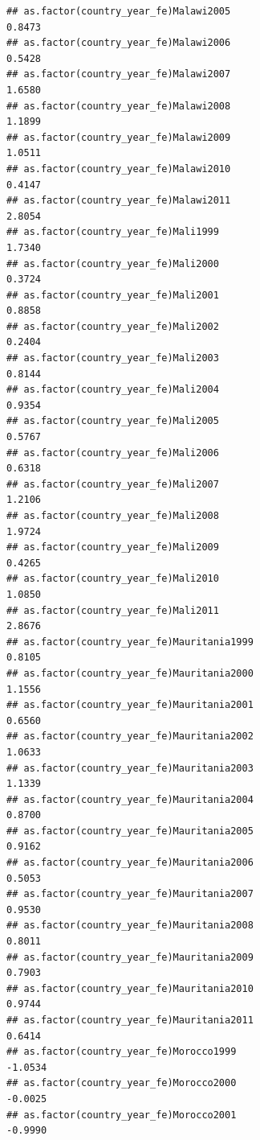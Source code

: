 \documentclass[
  a4paper,
]{article}
\begin{document}
\begin{verbatim}
## as.factor(country_year_fe)Malawi2005                            0.8473
## as.factor(country_year_fe)Malawi2006                            0.5428
## as.factor(country_year_fe)Malawi2007                            1.6580
## as.factor(country_year_fe)Malawi2008                            1.1899
## as.factor(country_year_fe)Malawi2009                            1.0511
## as.factor(country_year_fe)Malawi2010                            0.4147
## as.factor(country_year_fe)Malawi2011                            2.8054
## as.factor(country_year_fe)Mali1999                              1.7340
## as.factor(country_year_fe)Mali2000                              0.3724
## as.factor(country_year_fe)Mali2001                              0.8858
## as.factor(country_year_fe)Mali2002                              0.2404
## as.factor(country_year_fe)Mali2003                              0.8144
## as.factor(country_year_fe)Mali2004                              0.9354
## as.factor(country_year_fe)Mali2005                              0.5767
## as.factor(country_year_fe)Mali2006                              0.6318
## as.factor(country_year_fe)Mali2007                              1.2106
## as.factor(country_year_fe)Mali2008                              1.9724
## as.factor(country_year_fe)Mali2009                              0.4265
## as.factor(country_year_fe)Mali2010                              1.0850
## as.factor(country_year_fe)Mali2011                              2.8676
## as.factor(country_year_fe)Mauritania1999                        0.8105
## as.factor(country_year_fe)Mauritania2000                        1.1556
## as.factor(country_year_fe)Mauritania2001                        0.6560
## as.factor(country_year_fe)Mauritania2002                        1.0633
## as.factor(country_year_fe)Mauritania2003                        1.1339
## as.factor(country_year_fe)Mauritania2004                        0.8700
## as.factor(country_year_fe)Mauritania2005                        0.9162
## as.factor(country_year_fe)Mauritania2006                        0.5053
## as.factor(country_year_fe)Mauritania2007                        0.9530
## as.factor(country_year_fe)Mauritania2008                        0.8011
## as.factor(country_year_fe)Mauritania2009                        0.7903
## as.factor(country_year_fe)Mauritania2010                        0.9744
## as.factor(country_year_fe)Mauritania2011                        0.6414
## as.factor(country_year_fe)Morocco1999                          -1.0534
## as.factor(country_year_fe)Morocco2000                          -0.0025
## as.factor(country_year_fe)Morocco2001                          -0.9990

\end{verbatim}
\end{document}
